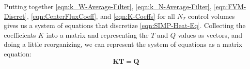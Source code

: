Putting together \eqref{eqn:k_W-Average-Filter}, \eqref{eqn:k_N-Average-Filter}, \eqref{eqn:FVM-Discret}, \eqref{eqn:CenterFluxCoeff}, and \eqref{eqn:K-Coeffs} for all $N_T$ control volumes gives us a system of equations that discretize \eqref{eqn:SIMP-Heat-Eq}. Collecting the coefficients $K$ into a matrix and representing the $T$ and $Q$ values as vectors, and doing a little reorganizing, we can represent the system of equations as a matrix equation:
\begin{equation}
	\mathbf{K}\mathbf{T}=\mathbf{Q}
\end{equation}